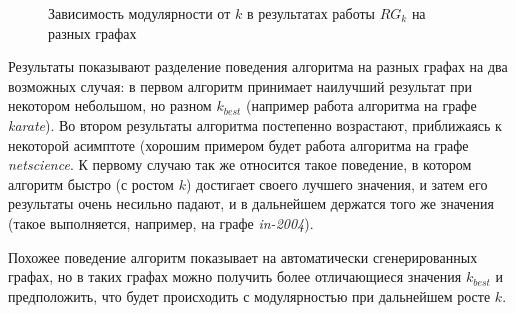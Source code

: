 \begin{figure}[H]
\begin{tikzpicture}
	\end{tikzpicture}
	\columnwidth
	\caption{Зависимость модулярности от $k$ в результатах работы $RG_k$ на разных графах}
\end{figure}

Результаты показывают разделение поведения алгоритма на разных графах на два возможных случая: в первом алгоритм принимает наилучший результат при некотором небольшом, но разном $k_{best}$ (например работа алгоритма на графе \emph{karate}). Во втором результаты алгоритма постепенно возрастают, приближаясь к некоторой асимптоте (хорошим примером будет работа алгоритма на графе \emph{netscience}. К первому случаю так же относится такое поведение, в котором алгоритм быстро (с ростом $k$) достигает своего лучшего значения, и затем его результаты очень несильно падают, и в дальнейшем держатся того же значения (такое выполняется, например, на графе \emph{in-2004}).

Похожее поведение алгоритм показывает на автоматически сгенерированных графах, но в таких графах можно получить более отличающиеся значения $k_{best}$ и предположить, что будет происходить с модулярностью при дальнейшем росте $k$.


